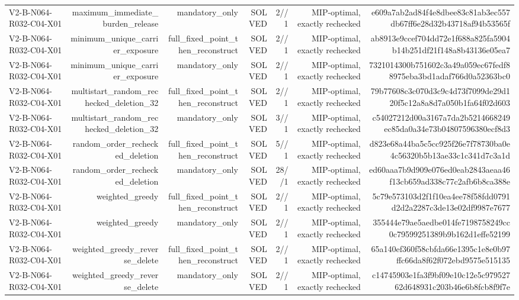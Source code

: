 {\begin{longtable}{lrrrrrr}
V2-B-N064-R032-C04-X01 & maximum\_immediate\_burden\_release & mandatory\_only & SOLVED & 2//1 & MIP-optimal, exactly rechecked & e609a7ab2ad84f4e8dbee83c81ab3ec557db67ff6e28d32b43718af94b53565f \\
V2-B-N064-R032-C04-X01 & minimum\_unique\_carrier\_exposure & full\_fixed\_point\_then\_reconstruct & SOLVED & 2//1 & MIP-optimal, exactly rechecked & ab8913e9ccef704dd72e1f688a825fa5904b14b251df21f148a8b43136e05ea7 \\
V2-B-N064-R032-C04-X01 & minimum\_unique\_carrier\_exposure & mandatory\_only & SOLVED & 2//1 & MIP-optimal, exactly rechecked & 7321014300b751602c3a49a059ec67fedf88975eba3bd1adaf766d0a52363bc0 \\
V2-B-N064-R032-C04-X01 & multistart\_random\_rechecked\_deletion\_32 & full\_fixed\_point\_then\_reconstruct & SOLVED & 2//1 & MIP-optimal, exactly rechecked & 79b77608c3c070d3c9c4d73f7099de29d120f5c12a8a8d7a050b1fa64f02d603 \\
V2-B-N064-R032-C04-X01 & multistart\_random\_rechecked\_deletion\_32 & mandatory\_only & SOLVED & 3//1 & MIP-optimal, exactly rechecked & c54027212d00a3167a7da2b5214668249ec85da0a34e73b04807596380ecf8d3 \\
V2-B-N064-R032-C04-X01 & random\_order\_rechecked\_deletion & full\_fixed\_point\_then\_reconstruct & SOLVED & 5//1 & MIP-optimal, exactly rechecked & d823e68a44ba5c5cc925f26e7f78730ba0e4c56320b5b13ae33c1c341d7c3a1d \\
V2-B-N064-R032-C04-X01 & random\_order\_rechecked\_deletion & mandatory\_only & SOLVED & 28//1 & MIP-optimal, exactly rechecked & ed60aaa7b9d909e076ed0eab2843aeaa46f13cb659ad338c77c2afb6b8ca388e \\
V2-B-N064-R032-C04-X01 & weighted\_greedy & full\_fixed\_point\_then\_reconstruct & SOLVED & 2//1 & MIP-optimal, exactly rechecked & 5c79e573103d2f1f10ea4ee78f58fdd0791d2d2a2287c3de13e02df9987e7677 \\
V2-B-N064-R032-C04-X01 & weighted\_greedy & mandatory\_only & SOLVED & 2//1 & MIP-optimal, exactly rechecked & 355444e79ae5aedbe014fe7198758249cc0c79599251389b9b162d1effe52199 \\
V2-B-N064-R032-C04-X01 & weighted\_greedy\_reverse\_delete & full\_fixed\_point\_then\_reconstruct & SOLVED & 2//1 & MIP-optimal, exactly rechecked & 65a140ef360f58cbfda66e1395c1e8e0b97ffc66da8f62f072ebd9575e515135 \\
V2-B-N064-R032-C04-X01 & weighted\_greedy\_reverse\_delete & mandatory\_only & SOLVED & 2//1 & MIP-optimal, exactly rechecked & c14745903e1fa3f9bf09e10c12e5c97952762d648931c203b46e6b8fcb8f9f7e \\

\end{longtable}}
